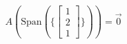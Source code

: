 \documentclass[preview]{standalone}
\begin{document}
\begin{align*}
A(\text{Span}\left(\{\begin{bmatrix} 1 \\ 2 \\ 1 \end{bmatrix}\}\right)) = \vec{0}
\end{align*}
\end{document}
